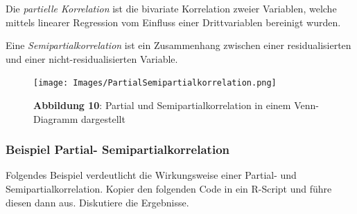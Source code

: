 \documentclass[]{article}
\begin{document}
Die \emph{partielle Korrelation} ist die bivariate Korrelation zweier Variablen, welche mittels linearer Regression vom Einfluss einer Drittvariablen bereinigt wurden.

Eine \emph{Semipartialkorrelation} ist ein Zusammenhang zwischen einer residualisierten und einer nicht-residualisierten Variable.

\begin{figure}
\centering
\texttt{[image: Images/PartialSemipartialkorrelation.png]}
\caption{\textbf{Abbildung 10}: Partial und Semipartialkorrelation in einem Venn-Diagramm dargestellt}
\end{figure}

\hypertarget{beispiel-partial--semipartialkorrelation}{%
\subsubsection*{Beispiel Partial- Semipartialkorrelation}\label{beispiel-partial--semipartialkorrelation}}

Folgendes Beispiel verdeutlicht die Wirkungsweise einer Partial- und Semipartialkorrelation. Kopier den folgenden Code in ein R-Script und führe diesen dann aus. Diskutiere die Ergebnisse.
\end{document}
